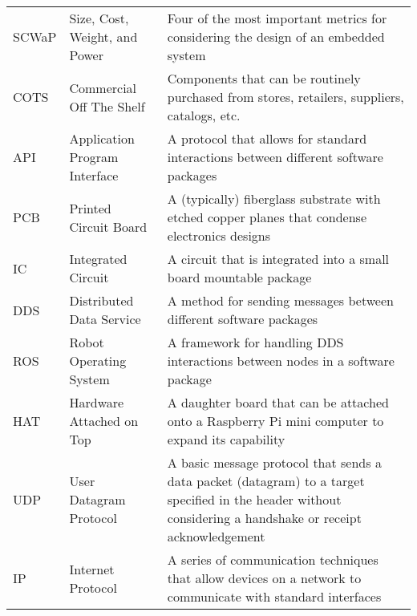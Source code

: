 \begin{longtable}{l m{} m{}}
        SCWaP & Size, Cost, Weight, and Power & Four of the most important metrics for considering the design of an embedded system \\
        COTS & Commercial Off The Shelf & Components that can be routinely purchased from stores, retailers, suppliers, catalogs, etc. \\
        API & Application Program Interface & A protocol that allows for standard interactions between different software packages \\
        PCB & Printed Circuit Board & A (typically) fiberglass substrate with etched copper planes that condense electronics designs \\
        IC & Integrated Circuit & A circuit that is integrated into a small board mountable package \\
        DDS & Distributed Data Service & A method for sending messages between different software packages \\
        ROS & Robot Operating System & A framework for handling DDS interactions between nodes in a software package \\
        HAT & Hardware Attached on Top & A daughter board that can be attached onto a Raspberry Pi mini computer to expand its capability \\
        UDP & User Datagram Protocol & A basic message protocol that sends a data packet (datagram) to a target specified in the header without considering a handshake or receipt acknowledgement \\
        IP & Internet Protocol & A series of communication techniques that allow devices on a network to communicate with standard interfaces
\end{longtable}
